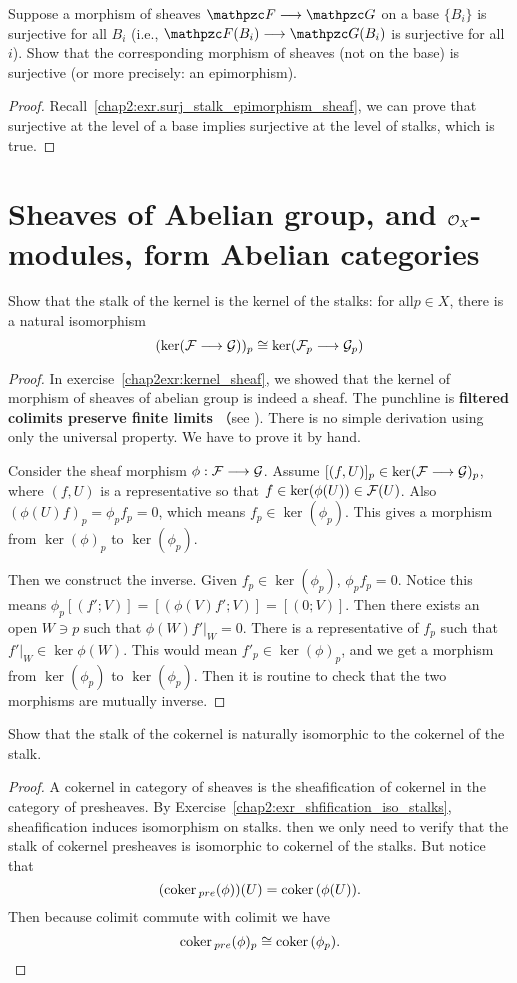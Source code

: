 \documentclass[11pt,fleqn]{book} %
\begin{document}
\begin{exr}
Suppose a morphism of sheaves $\pzf\lrta\pzg$ on a base $\{B_i\}$ is surjective for all $B_i$ (i.e., $\pzf(B_i) \lrta \pzg(B_i)$ is surjective for all $i$). Show that the corresponding morphism of sheaves (not on the base) is surjective (or more precisely: an epimorphism).
\end{exr}
\begin{proof}
Recall~\ref{chap2:exr.surj_stalk_epimorphism_sheaf}, we can prove that surjective at the level of a base implies surjective at the level of stalks, which is true.
\end{proof}




\section{Sheaves of Abelian group, and ${\cal O}_X$-modules, form Abelian categories}
\begin{exr}
Show that the stalk of the kernel is the kernel of the stalks: for all$ p \in  X$, there is a natural isomorphism
$$
(\ker({\cal F}\longrightarrow {\cal G}))_p\cong \ker ({\cal F}_p\longrightarrow {\cal G}_p)
$$
\end{exr}
\begin{proof}
In exercise~\ref{chap2exr:kernel_sheaf}, we showed that the kernel of morphism of sheaves of abelian group is indeed a sheaf. The punchline is \textbf{filtered colimits preserve finite limits} （see \cite[p.~216]{mac1998categories}). There is no simple derivation using only the universal property. We have to prove it by hand. 

Consider the sheaf morphism $\phi:{\cal F}\longrightarrow {\cal G}$.
Assume $[(f,U)]_p\in \ker({\cal F}\longrightarrow{\cal G})_p$, where $(f,U)$ is a representative so that $f\in \ker (\phi(U))\in {\cal F}(U)$.  Also $(\phi(U)f)_p=\phi_pf_p=0$, which means $f_p\in \ker(\phi_p)$. This gives a morphism from $\ker(\phi)_p$ to $\ker(\phi_p)$.

Then we construct the inverse. Given $f_p\in \ker(\phi_p)$, $\phi_pf_p=0$. Notice this means $\phi_p[(f';V)]=[(\phi(V)f';V)]=[(0;V)]$. Then there exists an open $W\ni p$ such that $\phi(W)f'|_W=0$. There is a representative of $f_p$ such that $f'|_W\in\ker \phi(W)$. This would mean $f'_p\in\ker(\phi)_p$, and we get a morphism from $\ker(\phi_p)$ to $\ker(\phi_p)$. Then it is routine to check that the two morphisms are mutually inverse.
\end{proof}

\begin{exr}
Show that the stalk of the cokernel is naturally isomorphic to the cokernel of the stalk.
\end{exr}
\begin{proof}
A cokernel in category of sheaves is the sheafification of cokernel in the category of presheaves. By Exercise~\ref{chap2:exr_shfification_iso_stalks}, sheafification induces isomorphism on stalks. then we only need to verify that the stalk of cokernel presheaves is isomorphic to cokernel of the stalks. But notice that 
$$
(\text{coker\,}_{pre}(\phi))(U)=\text{coker\,}(\phi(U)).
$$
Then because colimit commute with colimit we have 
$$
\text{coker\,}_{pre}(\phi)_p\cong \text{coker\,}(\phi_p).
$$
\end{proof}
\end{document}
